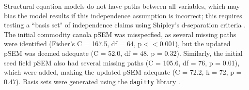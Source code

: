 \documentclass[12pt]{article} %
\begin{document}
Structural equation models do not have paths between all variables, which may bias the model results if this independence assumption is incorrect; this requires testing a ``basis set" of independence claims using Shipley's d-separation criteria \citep{shipley2000, shipley2009}.
The initial commodity canola pSEM was misspecfied, as several missing paths were identified (Fisher's C = 167.5, df = 64, p$<<$0.001), but the updated pSEM was deemed adequate (C = 52.0, df = 48, p = 0.32).
Similarly, the initial seed field pSEM also had several missing paths (C = 105.6, df = 76, p = 0.01), which were added, making the updated pSEM adequate (C = 72.2, k = 72, p = 0.47).
Basis sets were generated using the \texttt{dagitty} library \citep{textor2016}.


\end{document}
